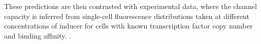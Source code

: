These predictions are then contrasted with experimental data, where the channel
capacity is inferred from single-cell fluorescence distributions taken at
different concentrations of inducer for cells with known transcription factor
copy number and binding affinity. . 
